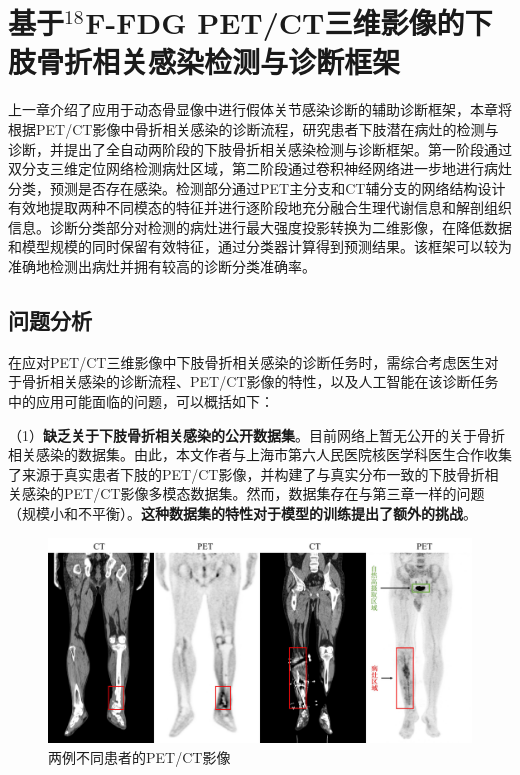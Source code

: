 \chapter{基于\texorpdfstring{\(^{18}\)}{18}F-FDG PET/CT三维影像的下肢骨折相关感染检测与诊断框架}

上一章介绍了应用于动态骨显像中进行假体关节感染诊断的辅助诊断框架，本章将根据PET/CT影像中骨折相关感染的诊断流程，研究患者下肢潜在病灶的检测与诊断，并提出了全自动两阶段的下肢骨折相关感染检测与诊断框架。第一阶段通过双分支三维定位网络检测病灶区域，第二阶段通过卷积神经网络进一步地进行病灶分类，预测是否存在感染。检测部分通过PET主分支和CT辅分支的网络结构设计有效地提取两种不同模态的特征并进行逐阶段地充分融合生理代谢信息和解剖组织信息。诊断分类部分对检测的病灶进行最大强度投影转换为二维影像，在降低数据和模型规模的同时保留有效特征，通过分类器计算得到预测结果。该框架可以较为准确地检测出病灶并拥有较高的诊断分类准确率。

\section{问题分析}

在应对PET/CT三维影像中下肢骨折相关感染的诊断任务时，需综合考虑医生对于骨折相关感染的诊断流程、PET/CT影像的特性，以及人工智能在该诊断任务中的应用可能面临的问题，可以概括如下：

（1）\textbf{缺乏关于下肢骨折相关感染的公开数据集}。目前网络上暂无公开的关于骨折相关感染的数据集。由此，本文作者与上海市第六人民医院核医学科医生合作收集了来源于真实患者下肢的PET/CT影像，并构建了与真实分布一致的下肢骨折相关感染的PET/CT影像多模态数据集。然而，数据集存在与第三章一样的问题（规模小和不平衡）。\textbf{这种数据集的特性对于模型的训练提出了额外的挑战}。

\begin{figure}[htbp]
  \centering
  \includegraphics[width=\textwidth]{figures/chap04_petct.jpg}
  \caption{两例不同患者的PET/CT影像}
  \label{fig:chap04_petct}
\end{figure}

